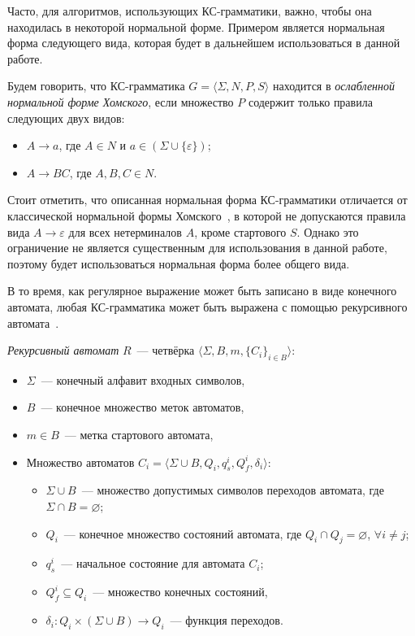 Часто, для алгоритмов, использующих КС-грамматики, важно, чтобы она находилась в некоторой нормальной форме. Примером является нормальная форма следующего вида, которая будет в дальнейшем использоваться в данной работе.

\begin{definition}
	Будем говорить, что КС-грамматика $G = \langle \Sigma, N, P, S \rangle$ находится в \textit{ослабленной нормальной форме Хомского}, если множество $P$ содержит только правила следующих двух видов:
	\begin{itemize}
		\item $A \rightarrow a$, где $A \in N$ и $a \in (\Sigma \cup \{\varepsilon\})$;
		\item $A \rightarrow B C$, где $A, B, C \in N$.
	\end{itemize}
\end{definition}

Стоит отметить, что описанная нормальная форма КС-грамматики отличается от классической нормальной формы Хомского~\cite{chomsky1959certain}, в которой не допускаются правила вида $A \rightarrow \varepsilon$ для всех нетерминалов $A$, кроме стартового $S$. Однако это ограничение не является существенным для использования в данной работе, поэтому будет использоваться нормальная форма более общего вида.

В то время, как регулярное выражение может быть записано в виде конечного автомата, любая КС-грамматика может быть выражена с помощью рекурсивного автомата~\cite{alur2005analysis}.

\begin{definition}
\textit{Рекурсивный автомат} $R$~--- четвёрка $\langle \Sigma, B, m, \{C_i\}_{i \in B} \rangle$:
\begin{itemize}
    \item $\Sigma$~--- конечный алфавит входных символов,
    \item $B$~--- конечное множество меток автоматов,
    \item $m \in B$~--- метка стартового автомата,
    \item Множество автоматов $C_i =  \langle \Sigma \cup B, Q_i, q_s^i, Q^i_f, \delta_i \rangle$:
\begin{itemize}
    \item $\Sigma \cup B$~--- множество допустимых символов переходов автомата, где $\Sigma \cap B = \varnothing$;
    \item $Q_i$~--- конечное множество состояний автомата, где $Q_i \cap Q_j = \varnothing$, $\forall i \neq j$;
    \item $q_s^i$~--- начальное состояние для автомата $C_i$;
    \item $Q_f^i \subseteq Q_i$~--- множество конечных состояний,
    \item $\delta_i: Q_i \times (\Sigma \cup B) \to Q_i$~--- функция переходов.
\end{itemize}
\end{itemize}
\end{definition}

